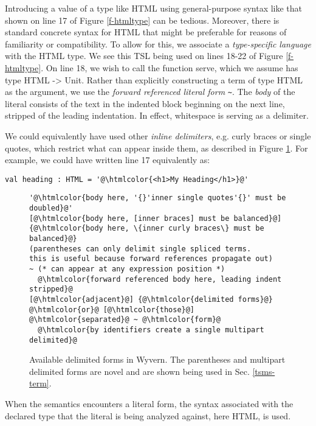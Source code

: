 \documentclass{sig-alternate}[10pt]
\makeatletter
\newcommand\BeraMonottfamily{%
  \def\fvm@Scale{0.85}%
  \fontfamily{fvm}\selectfont%
}
\newcommand{\htmlcolor}[1]{\textcolor[HTML]{339933}{#1}}
\newcommand{\mycaption}[1]{\vspace{-5px}\caption{#1}\vspace{-5px}}
\newcommand{\lstinlinew}[1]{{\scriptsize\BeraMonottfamily #1}}
\makeatother
\begin{document}
Introducing a value of a type like \lstinlinew{HTML} using general-purpose syntax like that shown on line 17 of Figure \ref{f-htmltype} can be tedious. Moreover, there is standard concrete syntax for HTML that might be preferable for reasons of familiarity or compatibility. To allow for this, we associate a \emph{type-specific language} with the \lstinlinew{HTML} type. %
We see this TSL being used on lines 18-22 of Figure \ref{f-htmltype}. On line 18, we wish to call the function \lstinlinew{serve}, which we assume has type \lstinlinew{HTML -> Unit}. Rather than explicitly constructing a term of type \lstinlinew{HTML} as the argument, we use the \emph{forward referenced literal form} \lstinline[style=wyvern]{~}. The \emph{body} of the literal consists of the text in the indented block beginning on the next line, stripped of the leading indentation. In effect, whitespace is serving as a delimiter. 

We could equivalently have used other \emph{inline delimiters}, e.g. curly braces or single quotes, which restrict what can appear inside them, as described in Figure \ref{f-delimited}. For example, we could have written line 17 equivalently as:
\vspace{-3px}\begin{lstlisting}[style=wyvern, numbers=none, frame=none]
  val heading : HTML = '@\htmlcolor{<h1>My Heading</h1>}@'
\end{lstlisting}\vspace{-4px}

\begin{figure}[t]
\begin{lstlisting}[style=tempwyvern]
'@\htmlcolor{body here, '{}'inner single quotes'{}' must be doubled}@'
[@\htmlcolor{body here, [inner braces] must be balanced}@]
{@\htmlcolor{body here, \{inner curly braces\} must be balanced}@}
(parentheses can only delimit single spliced terms. 
this is useful because forward references propagate out)
~ (* can appear at any expression position *)
  @\htmlcolor{forward referenced body here, leading indent stripped}@
[@\htmlcolor{adjacent}@] {@\htmlcolor{delimited forms}@} @\htmlcolor{or}@ [@\htmlcolor{those}@] @\htmlcolor{separated}@ ~ @\htmlcolor{form}@
  @\htmlcolor{by identifiers create a single multipart delimited}@
\end{lstlisting}
\mycaption{Available delimited forms in Wyvern. The parentheses and multipart delimited forms are novel and are shown being used in Sec. \ref{tsms-term}. }
\label{f-delimited}
\end{figure}
When the semantics encounters a literal form, the syntax associated with the declared type that the literal is being analyzed against, here \lstinlinew{HTML}, is used. 
\end{document}
